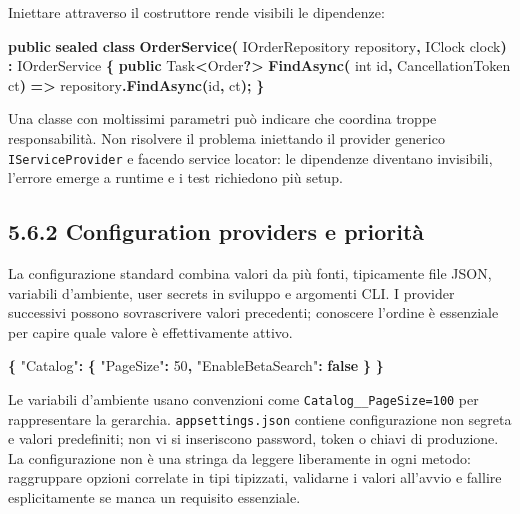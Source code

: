 \documentclass[
  italian,
  10pt,
]{book}
\newenvironment{Shaded}{\begin{snugshade}}{\end{snugshade}}
\newcommand{\DataTypeTok}[1]{\textcolor[rgb]{0.13,0.29,0.53}{#1}}
\newcommand{\DecValTok}[1]{\textcolor[rgb]{0.00,0.00,0.81}{#1}}
\newcommand{\FunctionTok}[1]{\textcolor[rgb]{0.13,0.29,0.53}{\textbf{#1}}}
\newcommand{\KeywordTok}[1]{\textcolor[rgb]{0.13,0.29,0.53}{\textbf{#1}}}
\newcommand{\NormalTok}[1]{#1}
\newcommand{\OperatorTok}[1]{\textcolor[rgb]{0.81,0.36,0.00}{\textbf{#1}}}
\begin{document}
Iniettare attraverso il costruttore rende visibili le dipendenze:

\begin{Shaded}
\begin{Highlighting}[]
\KeywordTok{public} \KeywordTok{sealed} \KeywordTok{class} \FunctionTok{OrderService}\OperatorTok{(}
\NormalTok{    IOrderRepository repository}\OperatorTok{,}
\NormalTok{    IClock clock}\OperatorTok{)} \OperatorTok{:}\NormalTok{ IOrderService}
\OperatorTok{\{}
    \KeywordTok{public}\NormalTok{ Task}\OperatorTok{\textless{}}\NormalTok{Order}\OperatorTok{?\textgreater{}} \FunctionTok{FindAsync}\OperatorTok{(}
        \DataTypeTok{int}\NormalTok{ id}\OperatorTok{,}\NormalTok{ CancellationToken ct}\OperatorTok{)} \OperatorTok{=\textgreater{}}
\NormalTok{        repository}\OperatorTok{.}\FunctionTok{FindAsync}\OperatorTok{(}\NormalTok{id}\OperatorTok{,}\NormalTok{ ct}\OperatorTok{);}
\OperatorTok{\}}
\end{Highlighting}
\end{Shaded}

Una classe con moltissimi parametri può indicare che coordina troppe
responsabilità. Non risolvere il problema iniettando il provider
generico \texttt{IServiceProvider} e facendo service locator: le
dipendenze diventano invisibili, l'errore emerge a runtime e i test
richiedono più setup.

\subsection{5.6.2 Configuration providers e
priorità}\label{configuration-providers-e-priorituxe0}

La configurazione standard combina valori da più fonti, tipicamente file
JSON, variabili d'ambiente, user secrets in sviluppo e argomenti CLI. I
provider successivi possono sovrascrivere valori precedenti; conoscere
l'ordine è essenziale per capire quale valore è effettivamente attivo.

\begin{Shaded}
\begin{Highlighting}[]
\FunctionTok{\{}
  \DataTypeTok{"Catalog"}\FunctionTok{:} \FunctionTok{\{}
    \DataTypeTok{"PageSize"}\FunctionTok{:} \DecValTok{50}\FunctionTok{,}
    \DataTypeTok{"EnableBetaSearch"}\FunctionTok{:} \KeywordTok{false}
  \FunctionTok{\}}
\FunctionTok{\}}
\end{Highlighting}
\end{Shaded}

Le variabili d'ambiente usano convenzioni come
\texttt{Catalog\_\_PageSize=100} per rappresentare la gerarchia.
\texttt{appsettings.json} contiene configurazione non segreta e valori
predefiniti; non vi si inseriscono password, token o chiavi di
produzione. La configurazione non è una stringa da leggere liberamente
in ogni metodo: raggruppare opzioni correlate in tipi tipizzati,
validarne i valori all'avvio e fallire esplicitamente se manca un
requisito essenziale.
\end{document}
